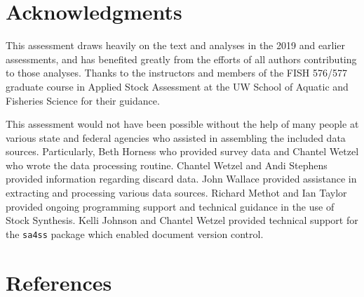 \documentclass[11pt,
  english,
  a4paper,
]{article}
\begin{document}

\hypertarget{acknowledgments}{%
\section{Acknowledgments}\label{acknowledgments}}

\leavevmode\tagmcend\tagstructend


This assessment draws heavily on the text and analyses in the 2019 and earlier assessments, and has benefited greatly from the efforts of all authors contributing to those analyses. Thanks to the instructors and members of the FISH 576/577 graduate course in Applied Stock Assessment at the UW School of Aquatic and Fisheries Science for their guidance.

\leavevmode\tagmcend\tagstructend\par

This assessment would not have been possible without the help of many people at various state and federal agencies who assisted in assembling the included data sources. Particularly, Beth Horness who provided survey data and Chantel Wetzel who wrote the data processing routine. Chantel Wetzel and Andi Stephens provided information regarding discard data. John Wallace provided assistance in extracting and processing various data sources. Richard Methot and Ian Taylor provided ongoing programming support and technical guidance in the use of Stock Synthesis. Kelli Johnson and Chantel Wetzel provided technical support for the \texttt{sa4ss} package which enabled document version control.

\clearpage


\hypertarget{references}{%
\section{References}\label{references}}
\end{document}
